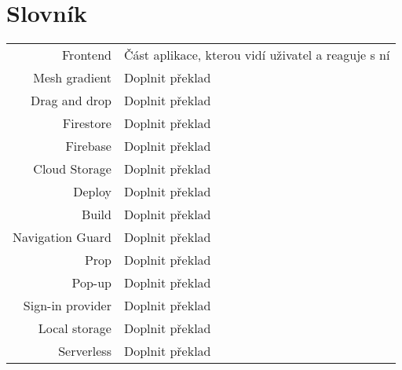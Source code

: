 
\chapter{Slovník}

\begin{tabular}{rl}
    Frontend & Část aplikace, kterou vidí uživatel a reaguje s ní \\
    Mesh gradient & Doplnit překlad \\ %
    Drag and drop & Doplnit překlad \\ %
    Firestore & Doplnit překlad \\ %
    Firebase & Doplnit překlad \\ %
    Cloud Storage & Doplnit překlad \\ %
    Deploy & Doplnit překlad \\ %
    Build & Doplnit překlad \\ %
    Navigation Guard & Doplnit překlad \\ %
    Prop & Doplnit překlad \\ %
    Pop-up & Doplnit překlad \\ %
    Sign-in provider & Doplnit překlad \\ %
    Local storage & Doplnit překlad \\ %
    Serverless & Doplnit překlad \\ %
\end{tabular}
